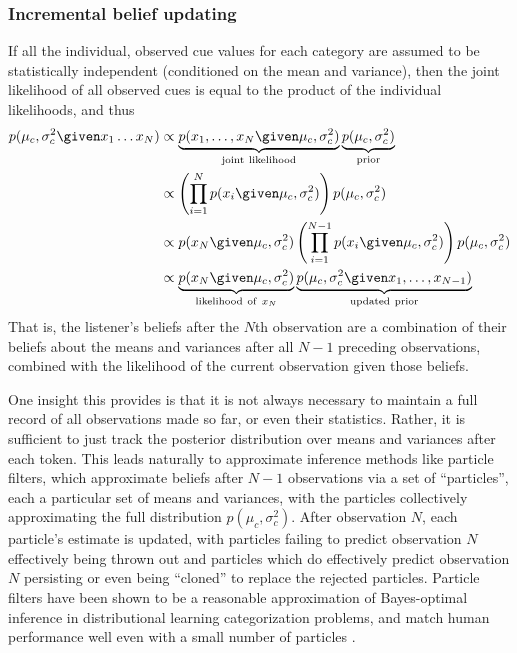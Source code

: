 \subsubsection{Incremental belief updating}
\label{sec:incr-beli-updat}

If all the individual, observed cue values for each category are assumed to be statistically independent (conditioned on the mean and variance), then the joint likelihood of all observed cues is equal to the product of the individual likelihoods, and thus
\begin{align}
  \label{eq:6}
  p(\mu_c, \sigma^2_c \given x_1 \ldots x_N) &\propto \underbrace{p(x_1, \ldots, x_N \given \mu_c, \sigma^2_c)}_{\mathrm{joint\ likelihood}} \underbrace{p(\mu_c, \sigma^2_c)}_{\mathrm{prior}} \\
  &\propto \left( \prod_{i=1}^N p(x_i \given \mu_c, \sigma^2_c)  \right) p(\mu_c, \sigma^2_c) \\
  &\propto p(x_N \given \mu_c, \sigma^2_c) \left( \prod_{i=1}^{N-1} p(x_i \given \mu_c, \sigma^2_c)  \right) p(\mu_c, \sigma^2_c) \\
  &\propto \underbrace{p(x_N \given \mu_c, \sigma^2_c)}_{\mathrm{likelihood\ of\ }x_N} \underbrace{p(\mu_c, \sigma^2_c \given x_1, \ldots, x_{N-1})}_{\mathrm{updated\ prior}}
\end{align}
That is, the listener's beliefs after the $N$th observation are a combination of their beliefs about the means and variances after all $N-1$ preceding observations, combined with the likelihood of the current observation given those beliefs.

One insight this provides is that it is not always necessary to maintain a full record of all observations made so far, or even their statistics.  Rather, it is sufficient to just track the posterior distribution over means and variances after each token.  This leads naturally to approximate inference methods like particle filters, which approximate beliefs after $N-1$ observations via a set of ``particles'', each a particular set of means and variances, with the particles collectively approximating the full distribution $p(\mu_c, \sigma^2_c)$.  After observation $N$, each particle's estimate is updated, with particles failing to predict observation $N$ effectively being thrown out and particles which do effectively predict observation $N$ persisting or even being ``cloned'' to replace the rejected particles.  Particle filters have been shown to be a reasonable approximation of Bayes-optimal inference in distributional learning categorization problems, and match human performance well even with a small number of particles \cite{Sanborn2010}.


